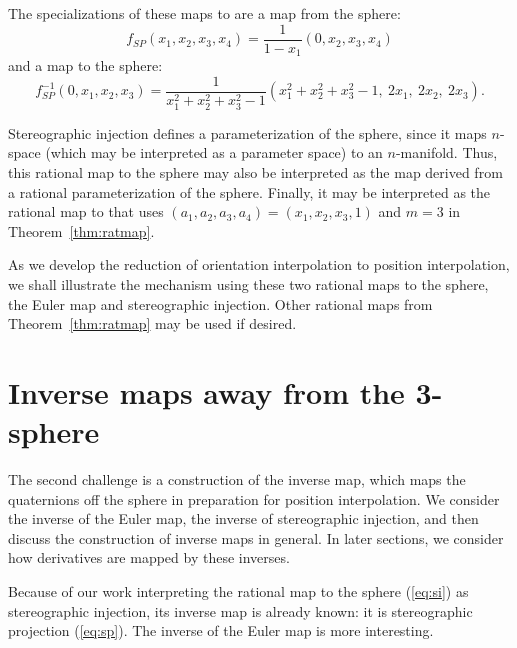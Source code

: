 \documentclass[12pt]{article}
\begin{document}
\noindent The specializations of these maps to  are a map from the sphere:
\begin{equation}
\label{eq:sp}
f_{SP}(x_1,x_2,x_3,x_4) = \frac{1}{1-x_1}(0,x_2,x_3,x_4)
\end{equation}
and a map to the sphere:
\begin{equation}
\label{eq:si}
f^{-1}_{SP}(0,x_1,x_2,x_3) = 
 \frac{1}{x_1^2 + x_2^2 + x_3^2 - 1}(x_1^2+x_2^2+x_3^2-1,\ 2x_1,\ 2x_2,\ 2x_3).
\end{equation}


Stereographic injection defines a parameterization of the sphere,
since it maps $n$-space (which may be interpreted as a parameter space) to an 
$n$-manifold.
Thus, this rational map to the sphere may also be interpreted
as the map derived from a rational parameterization of the sphere.
Finally, it may be interpreted as the rational map to  that uses
$(a_1,a_2,a_3,a_4) = (x_1,x_2,x_3,1)$ and $m=3$ in Theorem~\ref{thm:ratmap}.

As we develop the reduction of orientation interpolation to position interpolation,
we shall illustrate the mechanism using these two rational maps to the sphere,
the Euler map and stereographic injection.
Other rational maps from Theorem~\ref{thm:ratmap} may be used if desired.

\clearpage

\section{Inverse maps away from the 3-sphere}
\label{sec:inverse}

The second challenge is a construction of the inverse map,
which maps the quaternions off the sphere in preparation for position interpolation.
We consider the inverse of the Euler map, the inverse of stereographic injection,
and then discuss the construction of inverse maps in general.
In later sections, we consider how derivatives are mapped by these inverses.

Because of our work interpreting the rational map to the sphere (\ref{eq:si}) 
as stereographic injection,
its inverse map is already known: it is stereographic projection (\ref{eq:sp}).
The inverse of the Euler map is more interesting.
\end{document}
